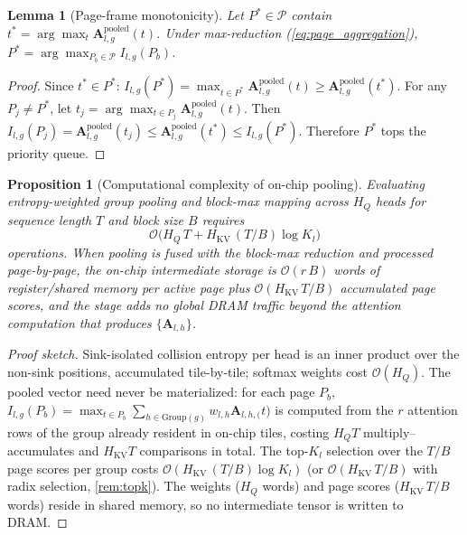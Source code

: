 \documentclass[final,5p,times,twocolumn]{elsarticle}
\newtheorem{lemma}{Lemma}
\newtheorem{proposition}{Proposition}
\theoremstyle{definition}
\theoremstyle{remark}
\newcommand{\HQ}{H_{Q}}
\newcommand{\HKV}{H_{\mathrm{KV}}}
\newcommand{\Attn}[2]{\mathbf{A}_{#1,#2}}
\newcommand{\AttnPool}[2]{\mathbf{A}^{\mathrm{pooled}}_{#1,#2}}
\newcommand{\Group}[1]{\mathrm{Group}(#1)}
\newcommand{\PageSet}{\mathcal{P}}
\newcommand{\PageImp}[3]{I_{#1,#2}(P_{#3})}
\begin{document}
\begin{lemma}[Page-frame monotonicity]
\label{lem:page_monotonicity}
Let $P^{*} \in \PageSet$ contain
 $t^{*} = \arg\max_t \AttnPool{l}{g}(t)$. Under max-reduction
(\cref{eq:page_aggregation}),
 $P^{*} = \arg\max_{P_b \in \PageSet} I_{l,g}(P_b)$.
\end{lemma}

\begin{proof}
Since $t^{*}\in P^{*}$:
 $I_{l,g}(P^{*})=\max_{t\in P^{*}}\AttnPool{l}{g}(t)
\ge\AttnPool{l}{g}(t^{*})$. For any $P_j\neq P^{*}$, let
 $t_j=\arg\max_{t\in P_j}\AttnPool{l}{g}(t)$. Then
 $I_{l,g}(P_j)=\AttnPool{l}{g}(t_j)\le\AttnPool{l}{g}(t^{*})
\le I_{l,g}(P^{*})$. Therefore $P^{*}$ tops the priority queue.
\end{proof}

\begin{proposition}[Computational complexity of on-chip pooling]
\label{prop:complexity}
Evaluating entropy-weighted group pooling and block-max mapping across
 $\HQ$ heads for sequence length $T$ and block size $B$ requires
\begin{equation}
  \mathcal{O}\!\bigl(\HQ\,T + \HKV\,(T/B)\log K_l\bigr)
  \label{eq:complexity_bound}
\end{equation}
operations. When pooling is fused with the block-max reduction and
processed page-by-page, the on-chip intermediate storage is
 $\mathcal{O}(r\,B)$ words of register/shared memory per active page plus
 $\mathcal{O}(\HKV\,T/B)$ accumulated page scores, and the stage adds no
global DRAM traffic beyond the attention computation that produces
 $\{\Attn{l}{h}\}$.
\end{proposition}

\begin{proof}[Proof sketch]
Sink-isolated collision entropy per head is an inner product over the
non-sink positions, accumulated tile-by-tile; softmax weights cost
 $\mathcal{O}(\HQ)$. The pooled vector need never be materialized: for
each page $P_b$,
 $\PageImp{l}{g}{b}=\max_{t\in P_b}\sum_{h\in\Group{g}}
w_{l,h}\Attn{l,h}(t)$ is computed from the $r$ attention rows of the group already resident in
on-chip tiles, costing $\HQ T$ multiply--accumulates and $\HKV T$ comparisons in total. The top-$K_l$ selection over the $T/B$ page scores
per group costs $\mathcal{O}(\HKV\,(T/B)\log K_l)$ (or
 $\mathcal{O}(\HKV\,T/B)$ with radix selection, \cref{rem:topk}). The
weights ($\HQ$ words) and page scores ($\HKV\,T/B$ words) reside in
shared memory, so no intermediate tensor is written to DRAM.
\end{proof}
\end{document}
